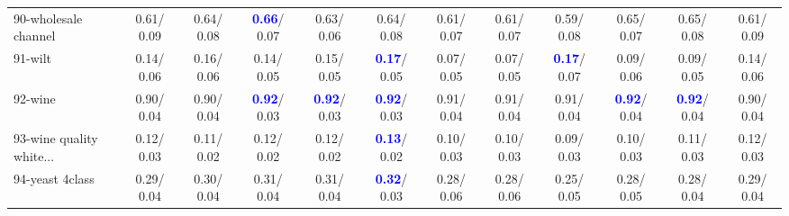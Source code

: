 \begin{table}[h]
\begin{center}
{\begin{tabular}{lc|c|c|c|c|c|c|c|c|c|c}
90-wholesale channel &   0.61/  0.09 &   0.64/  0.08 & \textcolor{blue}{\textbf{  0.66}}/  0.07 &   0.63/  0.06 &   0.64/  0.08 &   0.61/  0.07 &   0.61/  0.07 &   0.59/  0.08 &   0.65/  0.07 &   0.65/  0.08 &   0.61/  0.09 \\
91-wilt &   0.14/  0.06 &   0.16/  0.06 &   0.14/  0.05 &   0.15/  0.05 & \textcolor{blue}{\textbf{  0.17}}/  0.05 &   0.07/  0.05 &   0.07/  0.05 & \textcolor{blue}{\textbf{  0.17}}/  0.07 &   0.09/  0.06 &   0.09/  0.05 &   0.14/  0.06 \\
92-wine &   0.90/  0.04 &   0.90/  0.04 & \textcolor{blue}{\textbf{  0.92}}/  0.03 & \textcolor{blue}{\textbf{  0.92}}/  0.03 & \textcolor{blue}{\textbf{  0.92}}/  0.03 &   0.91/  0.04 &   0.91/  0.04 &   0.91/  0.04 & \textcolor{blue}{\textbf{  0.92}}/  0.04 & \textcolor{blue}{\textbf{  0.92}}/  0.04 &   0.90/  0.04 \\ \hline
93-wine quality white... &   0.12/  0.03 &   0.11/  0.02 &   0.12/  0.02 &   0.12/  0.02 & \textcolor{blue}{\textbf{  0.13}}/  0.02 &   0.10/  0.03 &   0.10/  0.03 &   0.09/  0.03 &   0.10/  0.03 &   0.11/  0.03 &   0.12/  0.03 \\
94-yeast 4class &   0.29/  0.04 &   0.30/  0.04 &   0.31/  0.04 &   0.31/  0.04 & \textcolor{blue}{\textbf{  0.32}}/  0.03 &   0.28/  0.06 &   0.28/  0.06 &   0.25/  0.05 &   0.28/  0.05 &   0.28/  0.04 &   0.29/  0.04 \\\end{tabular}}\label{stratsALCKappa2a5NNaRedux}
\end{center}
\end{table}
